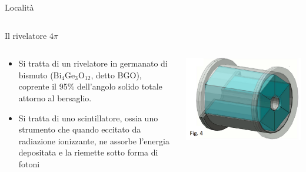 \documentclass [xcolor=svgnames] {beamer}
\begin{document}
\begin{frame}{Località}
\begin{columns}
\begin{column}{0.5\textwidth}
						\end{column}
				\end{columns}
		\end{frame}

	\begin{frame}{Il rivelatore $4\pi$}
	\begin{columns}
		\begin{column}{0.45\textwidth}
			\begin{itemize}
				\item Si tratta di un rivelatore in germanato di bismuto (Bi$_{4}$Ge$_{3}$O$_{12}$, detto BGO), coprente il 95\% dell'angolo solido totale attorno al bersaglio.
				\item Si tratta di uno scintillatore, ossia uno strumento che quando eccitato da radiazione ionizzante, ne assorbe l'energia depositata e la riemette sotto forma di fotoni
			\end{itemize}
		\end{column}
		\begin{column}{0.45\textwidth}
			\centering
			\includegraphics[width=\textwidth]{img/bgo_3d.png}
		\end{column}
	\end{columns}
	
\end{frame}
\end{document}
